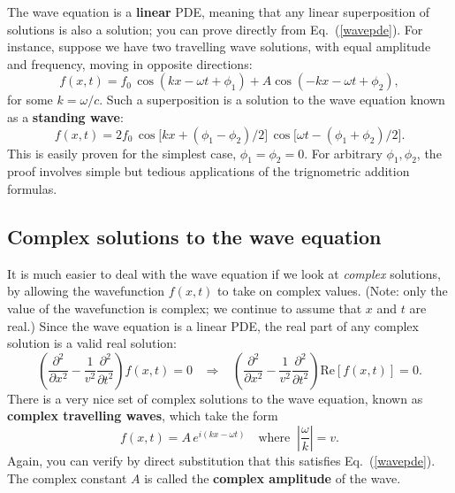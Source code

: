 \documentclass[10pt,a4paper]{article}
\begin{document}
The wave equation is a \textbf{linear} PDE, meaning that any linear
superposition of solutions is also a solution; you can prove directly
from Eq.~(\ref{wavepde}).  For instance, suppose we have two
travelling wave solutions, with equal amplitude and frequency, moving
in opposite directions:
\begin{equation}
  f(x,t) = f_0 \, \cos(kx - \omega t + \phi_1) + A \cos(-kx - \omega t + \phi_2),
\end{equation}
for some $k = \omega/c$. Such a superposition is a solution to the
wave equation known as a \textbf{standing wave}:
\begin{equation}
  f(x,t) = 2f_0 \, \cos\big[kx + (\phi_1-\phi_2)/2\big]\, \cos\big[\omega t - (\phi_1+\phi_2)/2\big].
\end{equation}
This is easily proven for the simplest case, $\phi_1 = \phi_2 = 0$.
For arbitrary $\phi_1, \phi_2$, the proof involves simple but tedious
applications of the trignometric addition formulas.

\subsection{Complex solutions to the wave equation}
\label{complex-solutions-to-the-wave-equation}

It is much easier to deal with the wave equation if we look at
\emph{complex} solutions, by allowing the wavefunction $f(x,t)$ to
take on complex values.  (Note: only the value of the wavefunction is
complex; we continue to assume that $x$ and $t$ are real.) Since the
wave equation is a linear PDE, the real part of any complex solution
is a valid real solution:
\begin{equation}
  \left(\frac{\partial^2}{\partial x^2} - \frac{1}{v^2} \frac{\partial^2}{\partial t^2}\right) f(x,t) = 0
  \;\;\;\Rightarrow \;\;\;
  \left(\frac{\partial^2}{\partial x^2} - \frac{1}{v^2} \frac{\partial^2}{\partial t^2}\right) \mathrm{Re}\left[f(x,t)\right] = 0.
\end{equation}
There is a very nice set of complex solutions to the wave equation,
known as \textbf{complex travelling waves}, which take the form
\begin{equation}
  f(x,t) = A \, e^{i(kx - \omega t)} \quad\mathrm{where}\;\; \left|\frac{\omega}{k}\right| = v.
  \label{complex_travel}
\end{equation}
Again, you can verify by direct substitution that this satisfies
Eq.~(\ref{wavepde}). The complex constant $A$ is called the
\textbf{complex amplitude} of the wave.
\end{document}
